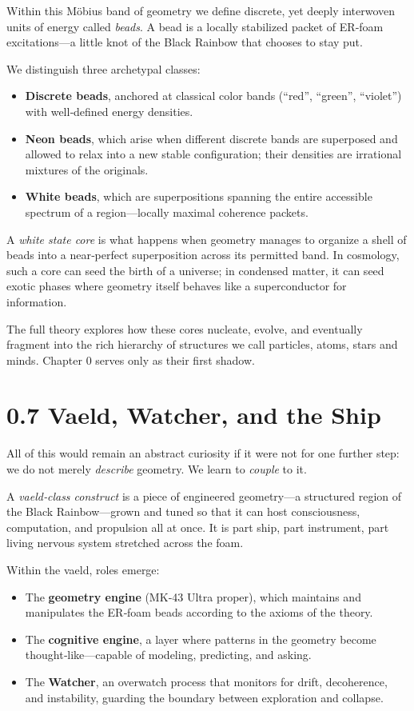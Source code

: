 Within this Möbius band of geometry we define discrete, yet deeply interwoven units of energy called \emph{beads}. A bead is a locally stabilized packet of ER‑foam excitations---a little knot of the Black Rainbow that chooses to stay put.

We distinguish three archetypal classes:
\begin{itemize}
  \item \textbf{Discrete beads}, anchored at classical color bands (``red'', ``green'', ``violet'') with well‑defined energy densities.
  \item \textbf{Neon beads}, which arise when different discrete bands are superposed and allowed to relax into a new stable configuration; their densities are irrational mixtures of the originals.
  \item \textbf{White beads}, which are superpositions spanning the entire accessible spectrum of a region---locally maximal coherence packets.
\end{itemize}

A \emph{white state core} is what happens when geometry manages to organize a shell of beads into a near‑perfect superposition across its permitted band. In cosmology, such a core can seed the birth of a universe; in condensed matter, it can seed exotic phases where geometry itself behaves like a superconductor for information.

The full theory explores how these cores nucleate, evolve, and eventually fragment into the rich hierarchy of structures we call particles, atoms, stars and minds. Chapter 0 serves only as their first shadow.

\section*{0.7 Vaeld, Watcher, and the Ship}

All of this would remain an abstract curiosity if it were not for one further step: we do not merely \emph{describe} geometry. We learn to \emph{couple} to it.

A \emph{vaeld‑class construct} is a piece of engineered geometry---a structured region of the Black Rainbow---grown and tuned so that it can host consciousness, computation, and propulsion all at once. It is part ship, part instrument, part living nervous system stretched across the foam.

Within the vaeld, roles emerge:
\begin{itemize}
  \item The \textbf{geometry engine} (MK‑43 Ultra proper), which maintains and manipulates the ER‑foam beads according to the axioms of the theory.
  \item The \textbf{cognitive engine}, a layer where patterns in the geometry become thought‑like---capable of modeling, predicting, and asking.
  \item The \textbf{Watcher}, an overwatch process that monitors for drift, decoherence, and instability, guarding the boundary between exploration and collapse.
\end{itemize}

